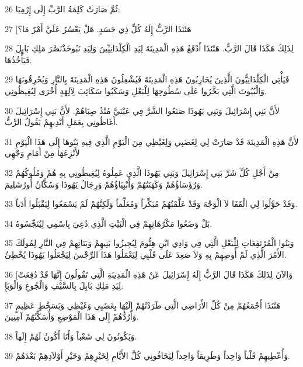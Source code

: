 \par 26 ثُمَّ صَارَتْ كَلِمَةُ الرَّبِّ إِلَى إِرْمِيَا:
\par 27 [هَئَنَذَا الرَّبُّ إِلَهُ كُلِّ ذِي جَسَدٍ. هَلْ يَعْسُرُ عَلَيَّ أَمْرٌ مَا؟
\par 28 لِذَلِكَ هَكَذَا قَالَ الرَّبُّ. هَئَنَذَا أَدْفَعُ هَذِهِ الْمَدِينَةَ لِيَدِ الْكِلْدَانِيِّينَ وَلِيَدِ نَبُوخَذْنَصَّرَ مَلِكِ بَابِلَ فَيَأْخُذُهَا.
\par 29 فَيَأْتِي الْكِلْدَانِيُّونَ الَّذِينَ يُحَارِبُونَ هَذِهِ الْمَدِينَةَ فَيُشْعِلُونَ هَذِهِ الْمَدِينَةَ بِالنَّارِ وَيُحْرِقُونَهَا وَالْبُيُوتَ الَّتِي بَخَّرُوا عَلَى سُطُوحِهَا لِلْبَعْلِ وَسَكَبُوا سَكَائِبَ لِآلِهَةٍ أُخْرَى لِيُغِيظُونِي.
\par 30 لأَنَّ بَنِي إِسْرَائِيلَ وَبَنِي يَهُوذَا صَنَعُوا الشَّرَّ فِي عَيْنَيَّ مُنْذُ صِبَاهُمْ. لأَنَّ بَنِي إِسْرَائِيلَ أَغَاظُونِي بِعَمَلِ أَيْدِيهِمْ يَقُولُ الرَّبُّ.
\par 31 لأَنَّ هَذِهِ الْمَدِينَةَ قَدْ صَارَتْ لِي لِغَضَبِي وَلِغَيْظِي مِنَ الْيَوْمِ الَّذِي فِيهِ بَنُوهَا إِلَى هَذَا الْيَوْمِ لأَنْزِعَهَا مِنْ أَمَامِ وَجْهِي
\par 32 مِنْ أَجْلِ كُلِّ شَرِّ بَنِي إِسْرَائِيلَ وَبَنِي يَهُوذَا الَّذِي عَمِلُوهُ لِيُغِيظُونِي بِهِ هُمْ وَمُلُوكُهُمْ وَرُؤَسَاؤُهُمْ وَكَهَنَتُهُمْ وَأَنْبِيَاؤُهُمْ وَرِجَالُ يَهُوذَا وَسُكَّانُ أُورُشَلِيمَ.
\par 33 وَقَدْ حَوَّلُوا لِي الْقَفَا لاَ الْوَجْهَ وَقَدْ عَلَّمْتُهُمْ مُبَكِّراً وَمُعَلِّماً وَلَكِنَّهُمْ لَمْ يَسْمَعُوا لِيَقْبَلُوا أَدَباً.
\par 34 بَلْ وَضَعُوا مَكْرُهَاتِهِمْ فِي الْبَيْتِ الَّذِي دُعِيَ بِاسْمِي لِيُنَجِّسُوهُ.
\par 35 وَبَنُوا الْمُرْتَفِعَاتِ لِلْبَعْلِ الَّتِي فِي وَادِي ابْنِ هِنُّومَ لِيُجِيزُوا بَنِيهِمْ وَبَنَاتِهِمْ فِي النَّارِ لِمُولَكَ الأَمْرَ الَّذِي لَمْ أُوصِهِمْ بِهِ وَلاَ صَعِدَ عَلَى قَلْبِي لِيَعْمَلُوا هَذَا الرِّجْسَ لِيَجْعَلُوا يَهُوذَا يُخْطِئُ.
\par 36 [وَالآنَ لِذَلِكَ هَكَذَا قَالَ الرَّبُّ إِلَهُ إِسْرَائِيلَ عَنْ هَذِهِ الْمَدِينَةِ الَّتِي تَقُولُونَ إِنَّهَا قَدْ دُفِعَتْ لِيَدِ مَلِكِ بَابِلَ بِالسَّيْفِ وَالْجُوعِ وَالْوَبَإِ.
\par 37 هَئَنَذَا أَجْمَعُهُمْ مِنْ كُلِّ الأَرَاضِي الَّتِي طَرَدْتُهُمْ إِلَيْهَا بِغَضَبِي وَغَيْظِي وَبَسَخْطٍ عَظِيمٍ وَأَرُدُّهُمْ إِلَى هَذَا الْمَوْضِعِ وَأُسَكِّنُهُمْ آمِنِينَ.
\par 38 وَيَكُونُونَ لِي شَعْباً وَأَنَا أَكُونُ لَهُمْ إِلَهاً.
\par 39 وَأُعْطِيهِمْ قَلْباً وَاحِداً وَطَرِيقاً وَاحِداً لِيَخَافُونِي كُلَّ الأَيَّامِ لِخَيْرِهِمْ وَخَيْرِ أَوْلاَدِهِمْ بَعْدَهُمْ.
